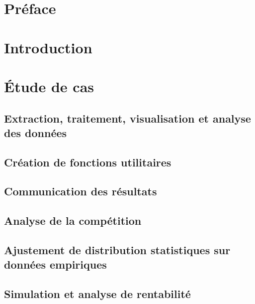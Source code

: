 \documentclass{report}
\newcommand*{\titlePage}{
	\begingroup 
		\hbox{
			\hspace*{0.1\textwidth}
			\rule{1.5pt}{\textheight}
			\hspace*{0.05\textwidth}
			\parbox[b]{0.75\textwidth}{
				{\noindent\LARGE\bfseries Étude de cas:} \\[\baselineskip]
				{\noindent\Huge\bfseries Analyse de marché du} \\
				{\noindent\Huge\bfseries transport aérien} \\
				{\noindent\Huge\bfseries canadien avec R} \\[2\baselineskip]
				{\large\textit{Atelier d'introduction à R}}\\[4\baselineskip]
				{\Large\textsc{Beauchemin, David}} \\[\baselineskip]
				{\Large\textsc{Cabral Cruz, Samuel}} \\[\baselineskip]
				{\Large\textsc{Goulet, Vincent}} \\[4\baselineskip]
				{\large {Dans le cadre du colloque R à Québec}} \\[\baselineskip]
				{\large {25 mai 2017}} 
				\vspace{0.4\textheight}}}\endgroup}
\begin{document}
\renewcommand{\labelitemi}{\tiny $\blacktriangleright$}
\renewcommand{\labelitemii}{\footnotesize $\bullet$}
\renewcommand{\labelitemiii}{\tiny \ding{117}}
\renewcommand{\labelitemiv}{\small $\star$}

\begin{titlepage}
	\clearpage\thispagestyle{empty}
	\titlePage
\end{titlepage}
\tableofcontents
\chapter*{Préface}
	

\chapter*{Introduction}
	

\chapter*{Étude de cas}
\setcounter{chapter}{1}
	
\section{Extraction, traitement, visualisation et analyse des données}
	

\section{Création de fonctions utilitaires}

\section{Communication des résultats}

\section{Analyse de la compétition}

\section{Ajustement de distribution statistiques sur données empiriques}

\section{Simulation et analyse de rentabilité}
\end{document}
